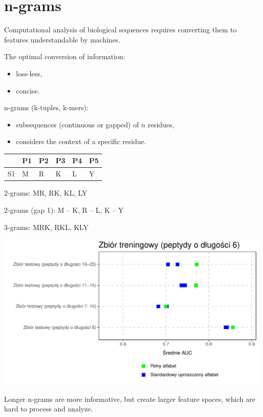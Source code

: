 \documentclass{beamer}\usepackage[]{graphicx}\usepackage[]{color}
\makeatletter
\def\maxwidth{ %
  \ifdim\Gin@nat@width>\linewidth
    \linewidth
  \else
    \Gin@nat@width
  \fi
}
\makeatother
\begin{document}
\section{n-grams}

\begin{frame}
Computational analysis of biological sequences requires converting them to features understandable by machines.

The optimal conversion of information:
\begin{itemize}
\item loss-less,
\item concise.
\end{itemize}
\end{frame}  

\begin{frame}
n-grams (k-tuples, k-mers):
\begin{itemize}
\item subsequences (continuous or gapped) of $n$ residues,
\item considers the context of a specific residue.
\end{itemize}


\begin{table}[ht]
\centering
\begin{tabular}{rlllll}
  \hline
 & P1 & P2 & P3 & P4 & P5 \\ 
  \hline
S1 & M & R & K & L & Y \\ 
   \hline
\end{tabular}
\end{table}



2-grams:
MR, RK, KL, LY

2-grams (gap 1):
M -- K, R -- L, K -- Y

3-grams:
MRK, RKL, KLY
\end{frame}  



\begin{frame}

\includegraphics[width=\maxwidth]{figure/unnamed-chunk-6-1} 

Longer n-grams are more informative, but create larger feature spaces, which are hard to process and analyze.
\end{frame}
\end{document}
